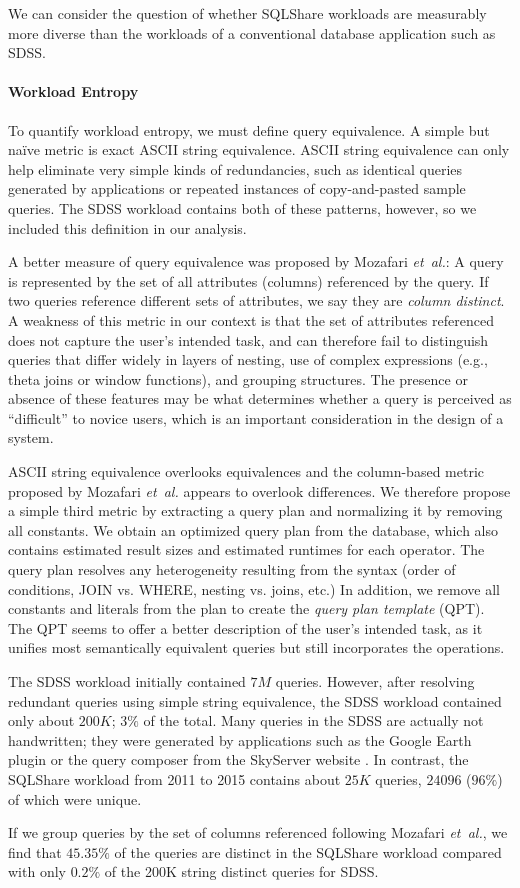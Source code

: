 \documentclass{sig-alternate}
\newcommand{\note}[2]{{\color{#1} {#2}}}
\newcommand{\reviewone}[1]{\note{black}{#1}}
\newcommand{\ea}{{\em et~al.}\xspace}
\newcommand{\sqlshare}{SQLShare}
\begin{document}
We can consider the question of whether \sqlshare{} workloads are measurably more diverse than the workloads
of a conventional database application such as SDSS.

\paragraph*{Workload Entropy}
\label{sec:entropy}
\reviewone{To quantify workload entropy, we must define query equivalence.  
A simple but na\"{i}ve metric is exact ASCII string equivalence.
ASCII string equivalence can only help eliminate very simple kinds of redundancies, such as identical queries generated by applications or repeated instances of copy-and-pasted sample queries. The SDSS workload contains both of these patterns, however, so we included this definition in our analysis.

A better measure of query equivalence was proposed by Mozafari \ea \cite{mozafari2015cliffguard}: A query is represented by the set of all attributes (columns) referenced by the query. If two queries reference different sets of attributes, we say they are \emph{column distinct}. A weakness of this metric in our context is that the set of attributes referenced does not capture the user's intended task, and can therefore fail to distinguish queries that differ widely in layers of nesting, use of complex expressions (e.g., theta joins or window functions), and grouping structures.
The presence or absence of these features may be what determines whether a query is perceived as ``difficult'' to novice users, which is an important consideration in the design of a system.

ASCII string equivalence overlooks equivalences and the column-based metric proposed by Mozafari \ea appears to overlook differences.  We therefore propose a simple third metric by extracting a query plan and normalizing it by removing all constants. 
We obtain an optimized query plan from the database, which also contains estimated result sizes and estimated runtimes for each operator. The query plan resolves any heterogeneity resulting from the syntax (order of conditions, JOIN vs. WHERE, nesting vs. joins, etc.) 
In addition, we remove all constants and literals from the plan to create the \emph{query plan template} (QPT). 
The QPT seems to offer a better description of the user's intended task, as it unifies most semantically equivalent
queries but still incorporates the operations.


The SDSS workload initially contained $7M$ queries. 
However, after resolving redundant queries using simple string equivalence, the SDSS workload contained only about $200K$; $3\%$ of the total.
Many queries in the SDSS are actually not handwritten; they were generated by applications such as the Google Earth plugin or the query composer from the SkyServer website
.
In contrast, the \sqlshare{} workload from 2011 to 2015 contains about $25K$ queries, $24096$ ($96\%$) of which were unique.

If we group queries by the set of columns referenced following Mozafari \ea, we find that $45.35\%$ of the queries are distinct in the \sqlshare{} workload compared with only $0.2\%$ of the 200K string distinct queries for SDSS.}
\end{document}

